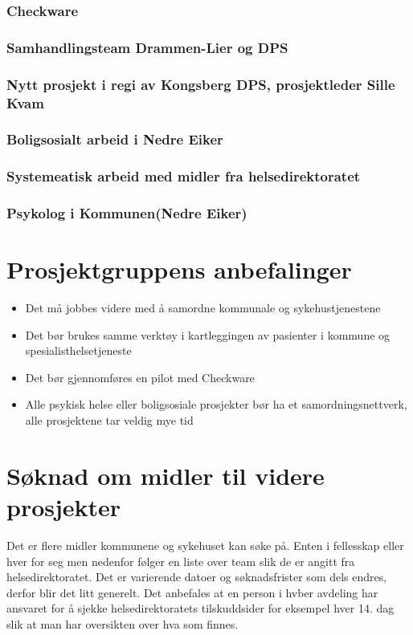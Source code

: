 \documentclass[11pt]{report} %
\begin{document}
                  \subsubsection{Checkware}  
                  \subsubsection{Samhandlingsteam Drammen-Lier og DPS}
                  \subsubsection{Nytt prosjekt i regi av Kongsberg DPS, prosjektleder Sille Kvam}
                  \subsubsection{Boligsosialt arbeid i Nedre Eiker}
                  \subsubsection{Systemeatisk arbeid med midler fra helsedirektoratet}
                  \subsubsection{Psykolog i Kommunen(Nedre Eiker)}
                \section{Prosjektgruppens anbefalinger}\label{chap:vvidere_anbef}
                  \begin{itemize}
                    \item Det må jobbes videre med å samordne kommunale og sykehustjenestene\\
                    \item Det bør brukes samme verktøy i kartleggingen av pasienter i kommune og spesialisthelsetjeneste\\
                    \item Det bør gjennomføres en pilot med Checkware\\
                    \item Alle psykisk helse eller boligsosiale prosjekter bør ha et samordningsnettverk, alle prosjektene tar veldig mye tid\\
                  \end{itemize}
                \section{Søknad om midler til videre prosjekter}\label{chap:vvidere_soknmid}
                  Det er flere midler kommunene og sykehuset kan søke på. Enten i fellesskap eller hver for seg men nedenfor følger en liste over team slik de er angitt fra helsedirektoratet. Det er varierende datoer og søknadsfrister som dels endres, derfor blir det litt generelt. Det anbefales at en person i hvber avdeling har ansvaret for å sjekke helsedirektoratets tilskuddsider for eksempel hver 14. dag slik at man har oversikten over hva som finnes. \\
\end{document}
